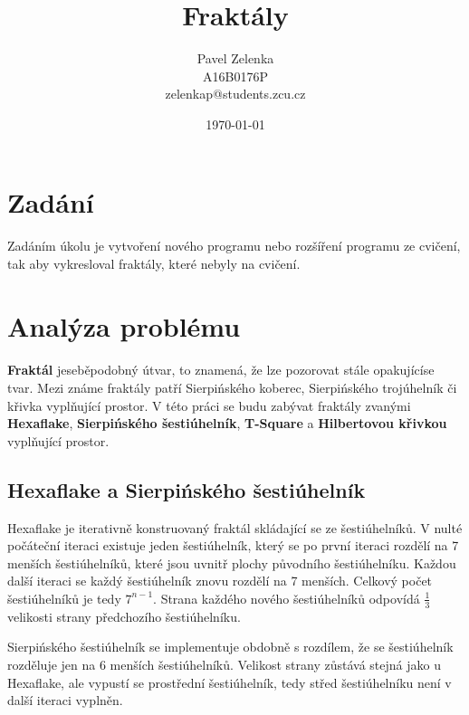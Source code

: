 \documentclass[12pt]{scrartcl}
\author{Pavel Zelenka\\A16B0176P\\zelenkap@students.zcu.cz}
\date{\today}
\title{Fraktály}
\begin{document}
\maketitle
{}
\newpage
{}
\newpage
\section{Zadání}
	
\paragraph{}
Zadáním úkolu je vytvoření nového programu nebo rozšíření programu ze cvičení, tak aby vykresloval fraktály, které nebyly na cvičení.

\section{Analýza problému}

\paragraph{}
\textbf{Fraktál} je\nobreakspace seběpodobný útvar, to znamená, že lze pozorovat stále opakující\nobreakspace se tvar. Mezi známe fraktály patří Sierpińského koberec, Sierpińského trojúhelník či křivka vyplňující prostor. V této práci se budu zabývat fraktály zvanými \textbf{Hexaflake}, \textbf{Sierpińského šestiúhelník}, \textbf{T-Square} a \textbf{Hilbertovou křivkou} vyplňující prostor. 

\subsection{Hexaflake a Sierpińského šestiúhelník}
Hexaflake je iterativně konstruovaný fraktál skládající se ze šestiúhelníků. V nulté počáteční iteraci existuje jeden šestiúhelník, který se po první iteraci rozdělí na 7 menších šestiúhelníků, které jsou uvnitř plochy původního šestiúhelníku. Každou další iteraci se každý šestiúhelník znovu rozdělí na 7 menších. Celkový počet šestiúhelníků je tedy $7^{n-1}$. Strana každého nového šestiúhelníků odpovídá $\frac{1}{3}$ velikosti strany předchozího šestiúhelníku.

Sierpińského šestiúhelník se implementuje obdobně s rozdílem, že se šestiúhelník rozděluje jen na 6 menších šestiúhelníků. Velikost strany zůstává stejná jako u Hexaflake, ale vypustí se prostřední šestiúhelník, tedy střed šestiúhelníku není v další iteraci vyplněn.
\end{document}
